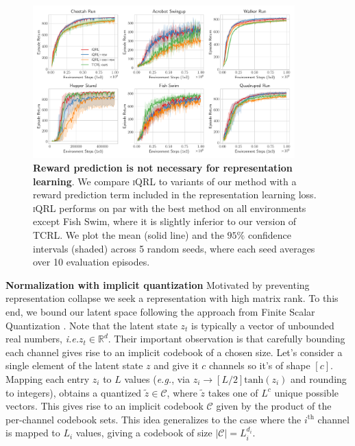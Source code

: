 \documentclass{article}
\makeatletter
\theoremstyle{plain}
\theoremstyle{definition}
\theoremstyle{remark}
\newcommand{\our}{\textsc{iQRL}\xspace}
\newcommand{\eg}{\textit{e.g.\@}\xspace}
\newcommand{\ie}{\textit{i.e.\@}\xspace}
\newcommand{\R}{\mathbb{R}}
\makeatother
\begin{document}
\begin{figure}[ht]
\vskip 0.2in
\begin{center}
\centerline{\includegraphics[width=0.9\textwidth]{./figs/reward-ablation.pdf}}
\caption{\textbf{Reward prediction is not necessary for representation learning}. We compare \our to variants of our method with a reward prediction term included in the representation learning loss. \our performs on par with the best method on all environments except Fish Swim, where it is slightly inferior to our version of TCRL. We plot the mean (solid line) and the $95\%$ confidence intervals (shaded) across 5 random seeds, where each seed averages over 10 evaluation episodes.}
\label{fig:reward-ablation}
\end{center}
\vskip -0.2in
\end{figure}


\textbf{Normalization with implicit quantization}
Motivated by preventing representation collapse we seek a representation with high matrix rank.
To this end, we bound our latent space following the approach from
Finite Scalar Quantization \citep[FSQ,][]{mentzerFiniteScalarQuantization2023}.
Note that the latent state $z_{t}$ is typically a vector of unbounded real numbers, \ie $z_{t} \in \R^{d}$.
Their important observation is that carefully bounding each channel gives rise to an implicit codebook of a chosen size.
Let's consider a single element of the latent state $z$ and give it $c$ channels so it's of shape $[c]$.
Mapping each entry $z_{i}$ to $L$ values (\eg, via $z_{i} \rightarrow [L/2] \text{tanh}(z_{i})$ and rounding to integers),
obtains a quantized $\tilde{z} \in \mathcal{C}$, where $\tilde{z}$ takes one of $L^{c}$ unique possible vectors.
This gives rise to an implicit codebook $\mathcal{C}$ given by the product of the per-channel codebook sets.
This idea generalizes to the case where the $i^{\text{th}}$ channel is mapped to $L_{i}$ values, giving a codebook of size $|\mathcal{C}| = L_{i}^{d_{i}}$.
\end{document}
